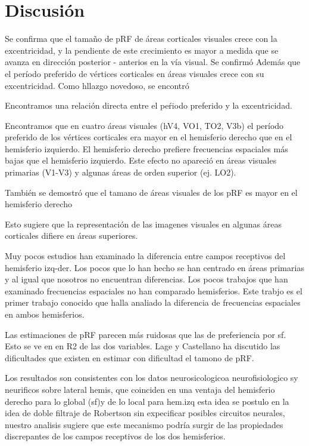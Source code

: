 \chapter{Discusi\'on}\label{chapter:discussion}

Se confirma que el tama\~no de pRF de \'areas corticales visuales crece con la excentricidad, y la pendiente de este crecimiento es mayor a medida que se avanza en direcci\'on posterior - anterios en la v\'ia visual. Se confirm\'o Adem\'as que el per\'iodo preferido de v\'ertices corticales en \'areas visuales crece con su excentricidad. Como hllazgo novedoso, se encontr\'o 

Encontramos una relaci\'on directa entre el pe\'riodo preferido y la excentricidad.

Encontramos que en cuatro \'areas visuales (hV4, VO1, TO2, V3b)  el per\'iodo preferido de los v\'ertices corticales era mayor en el hemisferio derecho que en el hemisferio izquierdo. El hemisferio derecho prefiere frecuencias espaciales m\'as bajas que el hemisferio izquierdo. Este efecto no apareci\'o en \'areas visuales primarias (V1-V3) y algunas \'areas de orden superior (ej. LO2).

Tambi\'en se demostr\'o que el tamano de \'areas visuales de los pRF es mayor en el hemisferio derecho 

Esto sugiere que la representaci\'on de las imagenes visuales en algunas \'areas corticales difiere en \'areas superiores.

Muy pocos estudios han examinado la diferencia entre campos receptivos del hemisferio izq-der. Los pocos que lo han hecho se han centrado en \'areas primarias y al igual que nosotros no encuentran diferencias. Los pocos trabajos que han examinado frecuencias espaciales no han comparado hemisferios. Este trabjo es el primer trabajo conocido que halla analiado la diferencia de frecuencias espaciales en ambos hemisferios.

Las estimaciones de pRF parecen m\'as ruidosas que las de preferiencia por sf. Esto se ve en en R2 de las dos variables. Lage y Castellano ha discutido las dificultades que existen en estimar con dificultad el tamono de pRF. 

Los resultados son consistentes con los datos neurosicologicoa neurofisiologico sy neurificos sobre lateral hemis, que coinciden en una ventaja del hemisferio derecho para lo global (sf)y de lo local para hem.izq  esta idea se postulo en la idea de doble filtraje de Robertson sin expecificar posibles circuitos neurales, nuestro analisis sugiere  que este mecanismo podr\'ia surgir de las propiedades discrepantes de los campos receptivos de los dos hemisferios. 


